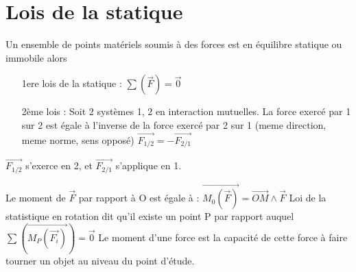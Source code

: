 \section{Lois de la statique}

\begin{wrapfigure}[5]{r}{0pt}
\end{wrapfigure}
Un ensemble de points matériels soumis à des forces est en équilibre statique ou immobile alors 
\begin{itemize}
	\item[1ere lois de la statique :] $\sum(\vec{F}) = \vec{0}$
	\item[2ème lois :] Soit 2 systèmes 1, 2 en interaction mutuelles. La force exercé par 1 sur 2 est égale à l'inverse de la force exercé par 2 sur 1 (meme direction, meme norme, sens opposé)
		$\overrightarrow{F_{1/2}} = - \overrightarrow{F_{2/1}}$
\end{itemize}

$\vec{F_{1/2}}$ s'exerce en 2, et $\vec{F_{2/1}}$ s'applique en 1.


		Le moment de $\vec{F}$ par rapport à O est égale à :
		$\overrightarrow{M_0(\vec{F})}  = \overrightarrow{OM} \wedge \vec{F}$
		Loi de la statistique en rotation dit qu'il existe un point P par rapport auquel $\sum(\overrightarrow{M_P(\vec{F_i})}) = \vec{0}$
		Le moment d'une force est la capacité de cette force à faire tourner un objet au niveau du point d'étude.

